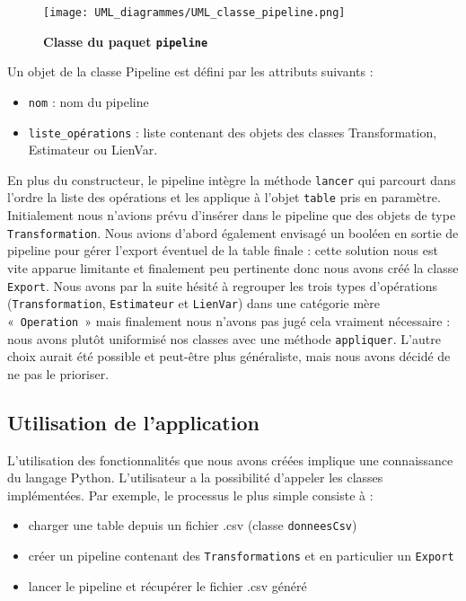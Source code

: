 \documentclass[11pt]{article}
\begin{document}
\begin{figure}[H]
    \caption{\textbf{Classe du paquet \texttt{pipeline}}}
    \label{UML_classe_pipeline}
    \centering
    \texttt{[image: UML\_diagrammes/UML\_classe\_pipeline.png]}
\end{figure}

Un objet de la classe Pipeline est défini par les attributs suivants :
\begin{itemize}
    \item \texttt{nom} : nom du pipeline
    \item \texttt{liste\_opérations} : liste contenant des objets des classes Transformation, Estimateur ou LienVar. 
\end{itemize}

En plus du constructeur, le pipeline intègre la méthode \texttt{lancer} qui parcourt dans l'ordre la liste des opérations et les applique à l'objet \texttt{table} pris en paramètre.
Initialement nous n'avions prévu d'insérer dans le pipeline que des objets de type \texttt{Transformation}. Nous avions d'abord également envisagé un booléen en sortie de pipeline pour gérer l'export éventuel de la table finale : cette solution nous est vite apparue limitante et finalement peu pertinente donc nous avons créé la classe \texttt{Export}. Nous avons par la suite hésité à regrouper les trois types d'opérations (\texttt{Transformation}, \texttt{Estimateur} et \texttt{LienVar}) dans une catégorie mère «~\texttt{Operation}~» mais finalement nous n'avons pas jugé cela vraiment nécessaire : nous avons plutôt uniformisé nos classes avec une méthode \texttt{appliquer}. L'autre choix aurait été possible et peut-être plus généraliste, mais nous avons décidé de ne pas le prioriser.




\subsection{Utilisation de l'application}

L'utilisation des fonctionnalités que nous avons créées implique une connaissance du langage Python. L'utilisateur a la possibilité d'appeler les classes implémentées. Par exemple, le processus le plus simple consiste à :
\begin{itemize}
    \item charger une table depuis un fichier .csv (classe \texttt{donneesCsv})
    \item créer un pipeline contenant des \texttt{Transformations} et en particulier un \texttt{Export}
    \item lancer le pipeline et récupérer le fichier .csv généré
\end{itemize}
\end{document}
